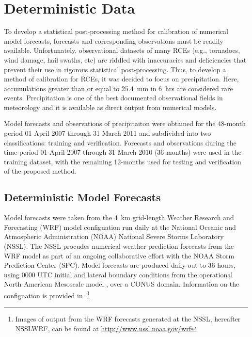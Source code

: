 

\chapter{Deterministic Data}
\label{ddata}

To develop a statistical post-processing method for calibration of numerical model forecasts, forecasts and corresponding observations must be readily available. Unfortunately, observational datasets of many RCEs (e.g., tornadoes, wind damage, hail swaths, etc) are riddled with inaccuracies and deficiencies \citep{Doswell1988, Weiss2002, Trapp2006, Ortega2009} that prevent their use in rigorous statistical post-processing. Thus, to develop a method of calibration for RCEs, it was decided to focus on precipitation. Here, accumulations greater than or equal to \mbox{25.4 mm} in \mbox{6 hrs} are considered rare events. Precipitation is one of the best documented observational fields in meteorology and it is available as direct output from numerical models.

Model forecasts and observations of precipitaiton were obtained for the 48-month period 01 April 2007 through 31 March 2011 and subdivided into two classifications: training and verification. Forecasts and observations during the time period 01 April 2007 through 31 March 2010 (36-months) were used in the training dataset, with the remaining 12-months used for testing and verification of the proposed method.




\section{Deterministic Model Forecasts}
\label{dmodel}

Model forecasts were taken from the \mbox{4 km} grid-length Weather Research and Forecasting (WRF) model configuation \citep{WRFV3} run daily at the National Oceanic and Atmospheric Administration (NOAA) National Severe Storms Laboratory (NSSL). The NSSL procudes numerical weather prediction forecasts from the WRF model as part of an ongoing collaborative effort with the NOAA Storm Prediction Center (SPC). Model forecasts are produced daily out to 36 hours, using 0000 UTC initial and lateral boundary conditions from the operational North American Mesoscale model \citep{NAM}, over a CONUS domain. Information on the configuation is provided in \cite{Kain2010}.\footnote{Images of output from the WRF forecasts generated at the NSSL, hereafter NSSLWRF, can be found at \url{http://www.nssl.noaa.gov/wrf}}




